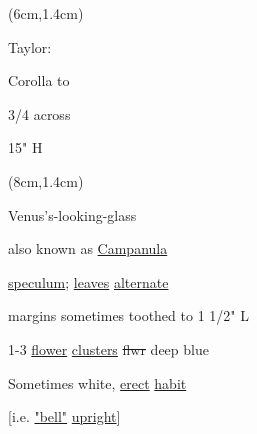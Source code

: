 \documentclass[a4paper]{article}
\begin{document}

\begin{textblock*}{2cm}(6cm,1.4cm)%
	\begin{minipage}{2cm} 
        \color{blue}
        Taylor:\par
        \vspace{5pt}
        \small
            Corolla to\par
            3/4 across\par
            15" H\par
        \normalfont			
	\end{minipage}%
\end{textblock*}%


\begin{textblock*}{6cm}(8cm,1.4cm)%
	\begin{minipage}{6cm} 
        \color{blue}
		Venus's-looking-glass\par
        also known as \ul{Campanula}\par
        \ul{speculum}; 
        \setul{}{2pt}
        \ul{leaves} \ul{alternate}\par
        margins sometimes toothed to 1 1/2" L \par
        1-3 \ul{flower} \ul{clusters} \sout{flwr} deep blue\par
        Sometimes white, \ul{erect} \ul{habit}\par
        {[i.e. \ul{"bell"} \ul{upright}]}\par		
	\end{minipage}%
\end{textblock*}%
\end{document}
